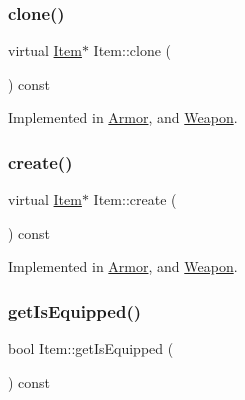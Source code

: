 \subsubsection{\texorpdfstring{clone()}{clone()}}
{\footnotesize\ttfamily virtual \mbox{\hyperlink{class_item}{Item}}$\ast$ Item\+::clone (\begin{DoxyParamCaption}{ }\end{DoxyParamCaption}) const\hspace{0.3cm}{\ttfamily [pure virtual]}}



Implemented in \mbox{\hyperlink{class_armor_aac8aec108de9a8a45bada1534c0f23b7}{Armor}}, and \mbox{\hyperlink{class_weapon_a4a914fa26d1d67a5d890252950f6b9be}{Weapon}}.

\mbox{\label{class_item_a17b3fa0cef44ada961e0d3c65e1de864}} 
\subsubsection{\texorpdfstring{create()}{create()}}
{\footnotesize\ttfamily virtual \mbox{\hyperlink{class_item}{Item}}$\ast$ Item\+::create (\begin{DoxyParamCaption}{ }\end{DoxyParamCaption}) const\hspace{0.3cm}{\ttfamily [pure virtual]}}



Implemented in \mbox{\hyperlink{class_armor_a21de0acaa6ecdb6f5937166b83da9b01}{Armor}}, and \mbox{\hyperlink{class_weapon_a0755dc1352391eb484644ab4e4cf144d}{Weapon}}.

\mbox{\label{class_item_a9839c6a1b61487bbbe15b7ebba07de34}} 
\subsubsection{\texorpdfstring{get\+Is\+Equipped()}{getIsEquipped()}}
{\footnotesize\ttfamily bool Item\+::get\+Is\+Equipped (\begin{DoxyParamCaption}{ }\end{DoxyParamCaption}) const}

\mbox{\label{class_item_a00e06647e1adeb62f2d95044476126ac}} 
